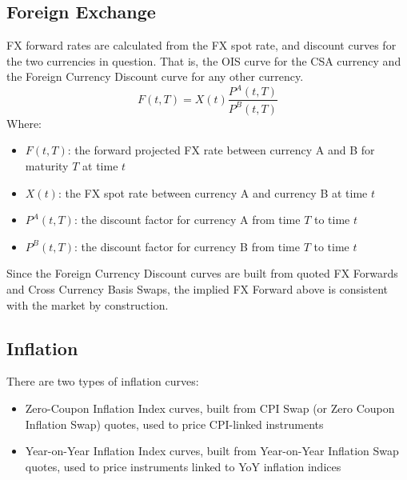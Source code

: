 \subsection{Foreign Exchange}

FX forward rates are calculated from the FX spot rate, and discount curves for the 
two currencies in question. That is, the OIS curve for the CSA currency and the 
Foreign Currency Discount curve for any other currency.
$$
F(t,T)=X(t) \frac{P^A(t,T)}{P^B(t,T)}
$$
Where:
\begin{itemize}
\item $F(t,T)$: the forward projected FX rate between currency A and B for maturity 
$T$ at time $t$ 
\item $X(t)$: the FX spot rate between currency A and currency B at time $t$
\item $P^A(t,T)$: the discount factor for currency A from time $T$ to time $t$
\item $P^B(t,T)$: the discount factor for currency B from time $T$ to time $t$
\end{itemize}

Since the Foreign Currency Discount curves are built from quoted FX Forwards and
Cross Currency Basis Swaps, the implied FX Forward above is consistent with the 
market by construction.

\subsection{Inflation}

There are two types of inflation curves:
\begin{itemize}
\item Zero-Coupon Inflation Index curves, built from CPI Swap (or Zero Coupon 
Inflation Swap) quotes, used to price CPI-linked instruments
\item Year-on-Year Inflation Index curves, built from Year-on-Year Inflation Swap 
quotes, used to price instruments linked to YoY inflation indices
\end{itemize}

%
%

